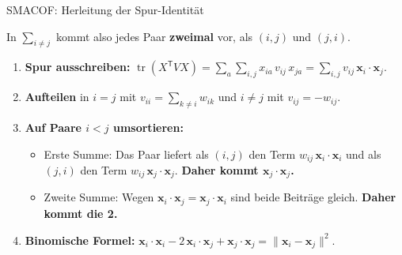 \begin{frame}{SMACOF: Herleitung der Spur-Identität}
{In $\sum_{i \neq j}$ kommt also jedes Paar \textbf{zweimal} vor, als $(i,j)$ und $(j,i)$.

\begin{enumerate}
  \item \textbf{Spur ausschreiben:} $\operatorname{tr}(X^{\mathsf{T}} V X) = \sum_a \sum_{i,j} x_{ia}\,v_{ij}\,x_{ja} = \sum_{i,j} v_{ij}\,\mathbf{x}_i \cdot \mathbf{x}_j$.
  \item \textbf{Aufteilen} in $i = j$ mit $v_{ii} = \sum_{k \neq i} w_{ik}$ und $i \neq j$ mit $v_{ij} = -w_{ij}$.
  \item \textbf{Auf Paare $i<j$ umsortieren:}
  \begin{itemize}
    \item Erste Summe: Das Paar liefert als $(i,j)$ den Term $w_{ij}\,\mathbf{x}_i \cdot \mathbf{x}_i$ und als $(j,i)$ den Term $w_{ij}\,\mathbf{x}_j \cdot \mathbf{x}_j$. \textbf{Daher kommt $\mathbf{x}_j \cdot \mathbf{x}_j$.}
    \item Zweite Summe: Wegen $\mathbf{x}_i \cdot \mathbf{x}_j = \mathbf{x}_j \cdot \mathbf{x}_i$ sind beide Beiträge gleich. \textbf{Daher kommt die 2.}
  \end{itemize}
  \item \textbf{Binomische Formel:} $\mathbf{x}_i \cdot \mathbf{x}_i - 2\,\mathbf{x}_i \cdot \mathbf{x}_j + \mathbf{x}_j \cdot \mathbf{x}_j = \lVert \mathbf{x}_i - \mathbf{x}_j \rVert^2$.
\end{enumerate}
}

\end{frame}


